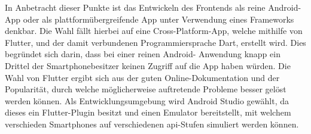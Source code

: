 In Anbetracht dieser Punkte ist das Entwickeln des Frontends als reine Android-App oder als plattformübergreifende App unter Verwendung eines Frameworks denkbar. Die Wahl fällt hierbei
auf eine Cross-Platform-App, welche mithilfe von Flutter, und der damit verbundenen Programmiersprache Dart, erstellt wird. Dies begründet sich darin, dass bei einer reinen Android-
Anwendung knapp ein Drittel der Smartphonebesitzer keinen Zugriff auf die App haben würden. Die Wahl von Flutter ergibt sich aus der guten Online-Dokumentation und der Popularität, 
durch welche möglicherweise auftretende Probleme besser gelöst werden können. \newline
Als Entwicklungsumgebung wird Android Studio gewählt, da dieses ein Flutter-Plugin besitzt und einen 
Emulator bereitstellt, mit welchem verschieden Smartphones auf verschiedenen \acrshort{api}-Stufen simuliert werden können.